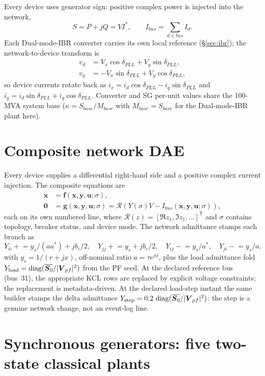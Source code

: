 \documentclass[12pt,a4paper]{article}
\newcommand{\vect}[1]{\boldsymbol{#1}}
\begin{document}
Every device uses generator sign: positive complex power is injected into the
network,
\[
S=P+jQ=V I^*,\qquad I_{bus}=\sum_{d\in bus} I_d.
\]
Each Dual-mode-IBR converter carries its own local reference (\S\ref{sec:ibr}); the
network-to-device transform is
\begin{align}
v_d&=V_x\cos\delta_{PLL}+V_y\sin\delta_{PLL},\\
v_q&=-V_x\sin\delta_{PLL}+V_y\cos\delta_{PLL},
\end{align}
so device currents rotate back as
$i_x=i_d\cos\delta_{PLL}-i_q\sin\delta_{PLL}$ and
$i_y=i_d\sin\delta_{PLL}+i_q\cos\delta_{PLL}$.  Converter and SG per-unit
values share the 100-MVA system base ($\kappa=S_{base}/M_{base}$ with
$M_{base}=S_{base}$ for the Dual-mode-IBR plant here).

\section{Composite network DAE}

Every device supplies a differential right-hand side and a positive complex
current injection.  The composite equations are
\begin{align}
\dot{\vect x}&=\vect f(\vect x,\vect y,\vect u;\sigma),\\
\vect 0&=\vect g(\vect x,\vect y,\vect u;\sigma)
          =\mathcal R\!\left(Y(\sigma)V-I_{bus}(\vect x,\vect y,\vect u;\sigma)\right),
\end{align}
each on its own numbered line,
where $\mathcal R(z)=[\Re z_1,\Im z_1,\ldots]^{\mathsf T}$ and $\sigma$
contains topology, breaker status, and device mode.  The network admittance
stamps each branch as
\[
Y_{ii}\mathrel{+}=y_s/(a a^*)+jb_c/2,\quad
Y_{jj}\mathrel{+}=y_s+jb_c/2,\quad
Y_{ij}\mathrel{-}=y_s/a^*,\quad
Y_{ji}\mathrel{-}=y_s/a,
\]
with $y_s=1/(r+jx)$, off-nominal ratio $a=\tau e^{j\phi}$, plus the load
admittance fold $Y_{\rm load}=\operatorname{diag}(\overline{\vect S_0}/|\vect V_{pf}|^2)$
from the PF seed.  At the declared reference bus (bus~31), the appropriate KCL
rows are replaced by explicit voltage constraints; the replacement is
metadata-driven.  At the declared load-step instant the same builder stamps the
delta admittance $Y_{\rm step}=0.2\,\operatorname{diag}(\overline{\vect S_0}/|\vect V_{pf}|^2)$:
the step is a genuine network change, not an event-log line.

\section{Synchronous generators: five two-state classical plants}
\end{document}
